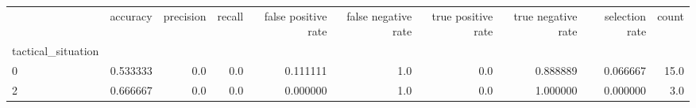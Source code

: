 \begin{tabular}{lrrrrrrrrr}
\toprule
{} &  accuracy &  precision &  recall &  false positive rate &  false negative rate &  true positive rate &  true negative rate &  selection rate &  count \\
tactical\_situation &           &            &         &                      &                      &                     &                     &                 &        \\
\midrule
0                  &  0.533333 &        0.0 &     0.0 &             0.111111 &                  1.0 &                 0.0 &            0.888889 &        0.066667 &   15.0 \\
2                  &  0.666667 &        0.0 &     0.0 &             0.000000 &                  1.0 &                 0.0 &            1.000000 &        0.000000 &    3.0 \\
\bottomrule
\end{tabular}
